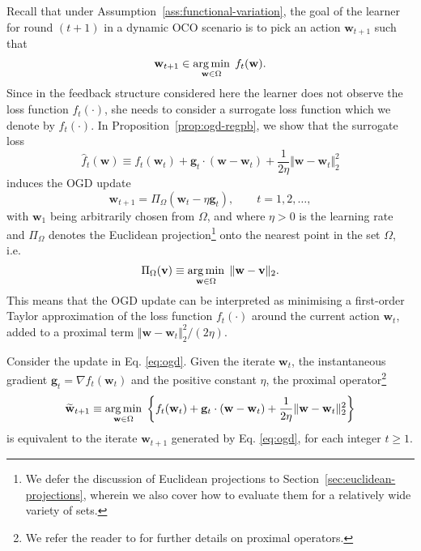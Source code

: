 Recall that under Assumption~\ref{ass:functional-variation}, the goal of the learner for round $(t+1)$ in a dynamic OCO scenario is to pick an action $\mathbf{w}_{t+1}$ such that
\begin{equation}
	\mathbf{w}_{t+1} \in \operatorname*{arg\,min}_{\mathbf{w} \in \Omega} \; f_t(\mathbf{w}).
\end{equation}
Since in the feedback structure considered here the learner does not observe the loss function $f_t(\cdot)$, she needs to consider a surrogate loss function which we denote by $\widehat{f}_t(\cdot)$. In Proposition~\ref{prop:ogd-regpb}, we show that the surrogate loss
\begin{equation}
	\widehat{f}_t(\mathbf{w})
	\equiv f_t(\mathbf{w}_t) + \mathbf{g}_t\cdot(\mathbf{w}-\mathbf{w}_t) + \frac{1}{2\eta}\Vert\mathbf{w}-\mathbf{w}_t\Vert_2^2
\end{equation}
induces the OGD update
\begin{equation}
\label{eq:ogd}
	\mathbf{w}_{t+1}
	= \Pi_{\Omega}(\mathbf{w}_t - \eta\mathbf{g}_t),
	\qquad t = 1, 2, \ldots,
\end{equation}
with $\mathbf{w}_1$ being arbitrarily chosen from $\Omega$, and where $\eta > 0$ is the learning rate and $\Pi_{\Omega}$ denotes the Euclidean projection\footnote{We defer the discussion of Euclidean projections to Section~\ref{sec:euclidean-projections}, wherein we also cover how to evaluate them for a relatively wide variety of sets.} onto the nearest point in the set $\Omega$, i.e.\
\begin{equation}
\label{eq:euclidean-projection-definition}
	\Pi_{\Omega}(\mathbf{v})
	\equiv \operatorname*{arg\,min}_{\mathbf{w} \in \Omega} \; \Vert\mathbf{w} - \mathbf{v}\Vert_2.
\end{equation}
This means that the OGD update can be interpreted as minimising a first-order Taylor approximation of the loss function $f_t(\cdot)$ around the current action $\mathbf{w}_t$, added to a proximal term $\Vert\mathbf{w}-\mathbf{w}_t\Vert_2^2/(2\eta)$.
\begin{proposition}
\label{prop:ogd-regpb}
Consider the update in Eq. \eqref{eq:ogd}. Given the iterate $\mathbf{w}_t$, the instantaneous gradient $\mathbf{g}_t = \nabla f_t(\mathbf{w}_t)$ and the positive constant $\eta$, the proximal operator\footnote{We refer the reader to \citep{proximal} for further details on proximal operators.}
  \begin{equation}
  \label{eq:ogd-regpb}
    \widetilde{\mathbf{w}}_{t+1} \equiv \operatorname*{arg\,min}_{\mathbf{w} \in \Omega} \; \left\{f_t(\mathbf{w}_t) + \mathbf{g}_t \cdot (\mathbf{w} - \mathbf{w}_t) + \frac{1}{2\eta}\Vert\mathbf{w} - \mathbf{w}_t\Vert_2^2\right\}
  \end{equation}
  is equivalent to the iterate $\mathbf{w}_{t+1}$ generated by Eq. \eqref{eq:ogd}, for each integer $t \geq 1$.
\end{proposition}
